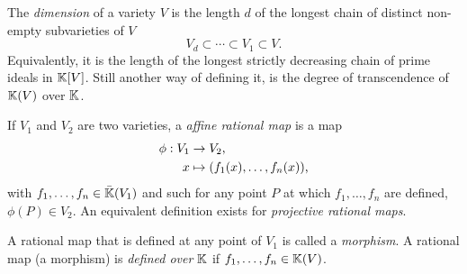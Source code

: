 The \textit{dimension} of a variety $V$
is the length $d$ of the longest chain of distinct non-empty
subvarieties of $V$
\begin{equation}
  \label{eq:219}
  V_d \subset \cdots \subset V_1 \subset V
  \text{.}
\end{equation}
Equivalently, it is the length of the longest strictly decreasing
chain of prime ideals in $\mathbb{K}[V]$. Still another way of defining it, is
the degree of transcendence of $\mathbb{K}(V)$ over $\mathbb{K}$.

If $V_1$ and $V_2$ are two varieties, a
\textit{affine rational map} is a map
\begin{equation}
  \label{eq:220}
  \begin{aligned}
    \phi : V_1&\rightarrow V_2\text{,}\\
    x &\mapsto (f_1(x),\ldots,f_n(x))\text{,}
  \end{aligned}
\end{equation}
with $f_1,\ldots,f_n\in\bar{\mathbb{K}}(V_1)$ and such for any point $P$ at
which $f_1,\ldots,f_n$ are defined, $\phi(P)\in V_2$. An equivalent
definition exists for \textit{projective rational maps}.

A rational map that is defined at any point of $V_1$ is called a
\textit{morphism}. A rational map (a
morphism) is
\textit{defined
  over} $\mathbb{K}$ if $f_1,\ldots,f_n\in\mathbb{K}(V)$.





